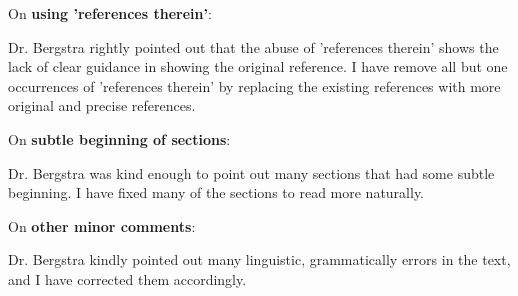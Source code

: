 \documentclass[11pt, oneside]{essay}
\begin{document}
On \textbf{using 'references therein'}:

Dr. Bergstra rightly pointed out that the abuse of
'references therein' shows the lack of clear guidance in
showing the original reference. I have remove all but one
occurrences of 'references therein' by replacing the
existing references with more original and precise
references.

On \textbf{subtle beginning of sections}:

Dr. Bergstra was kind enough to point out many sections that
had some subtle beginning. I have fixed many of the sections
to read more naturally.

On \textbf{other minor comments}:

Dr. Bergstra kindly pointed out many linguistic,
grammatically errors in the text, and I have corrected them
accordingly.
\end{document}
